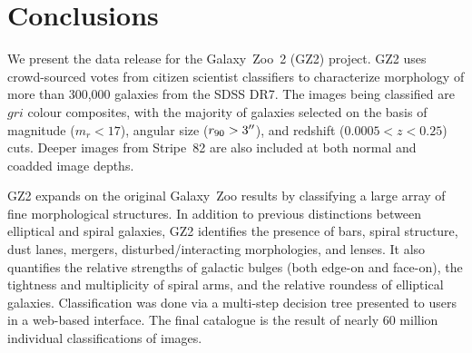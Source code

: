 \documentclass[useAMS,usenatbib]{mn2e}
\begin{document}
%


%


\section{Conclusions}\label{sec-conclusion}

We present the data release for the Galaxy~Zoo~2 (GZ2) project. GZ2 uses crowd-sourced votes from citizen scientist classifiers to characterize morphology of more than 300,000 galaxies from the SDSS DR7. The images being classified are $gri$ colour composites, with the majority of galaxies selected on the basis of magnitude ($m_r<17$), angular size ($r_{90}>3\hbox{$^{\prime\prime}$}$), and redshift ($0.0005<z<0.25$) cuts. Deeper images from Stripe~82 are also included at both normal and coadded image depths. 

GZ2 expands on the original Galaxy~Zoo results by classifying a large array of fine morphological structures. In addition to previous distinctions between elliptical and spiral galaxies, GZ2 identifies the presence of bars, spiral structure, dust lanes, mergers, disturbed/interacting morphologies, and lenses. It also quantifies the relative strengths of galactic bulges (both edge-on and face-on), the tightness and multiplicity of spiral arms, and the relative roundess of elliptical galaxies. Classification was done via a multi-step decision tree presented to users in a web-based interface. The final catalogue is the result of nearly 60 million individual classifications of images.
\end{document}
